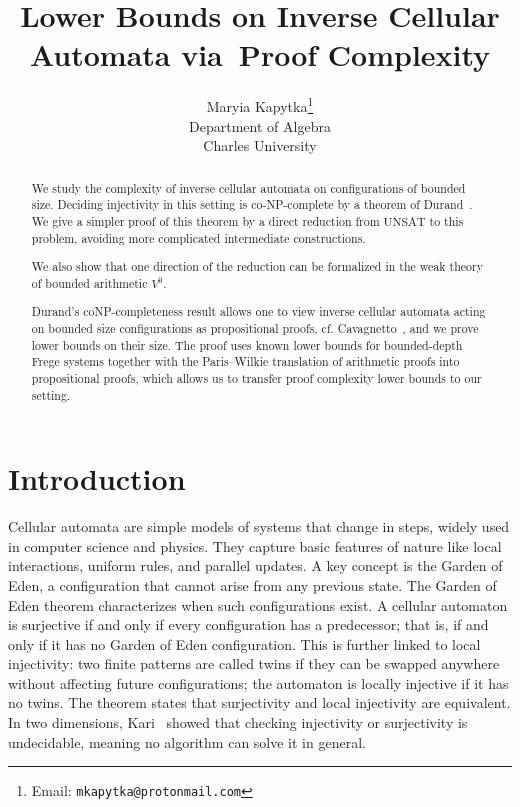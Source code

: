 \documentclass{article}
\title{Lower Bounds on Inverse Cellular Automata via~Proof Complexity}
\author{Maryia Kapytka\thanks{Email: \texttt{mkapytka@protonmail.com}}\\
\small{Department of Algebra} \\
\small{Charles University}
}
\theoremstyle{plain}
\theoremstyle{definition}
\begin{document}
\maketitle

\begin{abstract}
We study the complexity of inverse cellular automata on configurations of bounded size. Deciding injectivity in this setting is co-NP-complete by a theorem of Durand~\cite{DURAND1994387}. We give a simpler proof of this theorem by a direct reduction from $\mathrm{UNSAT}$ to this problem, avoiding more complicated intermediate constructions.

We also show that one direction of the reduction can be formalized in the weak theory of bounded arithmetic $V^0$. 

Durand's coNP-completeness result allows one to view inverse cellular automata acting on bounded size configurations  as propositional proofs, cf. Cavagnetto~\cite{Cavagnetto,Cavagnetto2011}, and we prove lower bounds on their size. The proof uses known lower bounds for bounded-depth Frege systems together with the Paris--Wilkie translation of arithmetic proofs into propositional proofs, which allows us to transfer proof complexity lower bounds to our setting.
\end{abstract}

\section{Introduction}

Cellular automata are simple models of systems that change in steps, widely used in computer science and physics. They capture basic features of nature like local interactions, uniform rules, and parallel updates. A key concept is the Garden of Eden, a configuration that cannot arise from any previous state.  The Garden of Eden theorem characterizes when such configurations exist. A cellular automaton is surjective if and only if every configuration has a predecessor; that is, if and only if it has no Garden of Eden configuration.  This is further linked to local injectivity: two finite patterns are called twins if they can be swapped anywhere without affecting future configurations; the automaton is locally injective if it has no twins. The theorem states that surjectivity and local injectivity are equivalent. In two dimensions, Kari~\cite{kari} showed that checking injectivity or surjectivity is undecidable, meaning no algorithm can solve it in general. 
\end{document}
